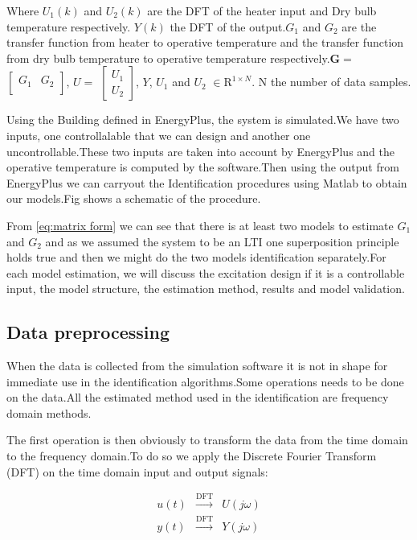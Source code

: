 \documentclass[a4paper,12pt]{article}
\numberwithin{equation}{section}
\begin{document}
\noindent
Where $ U_{1}(k)$ and $ U_{2}(k)$ are the DFT of the heater input and Dry bulb temperature respectively. $Y(k)$ the DFT of the output.$G_{1}$ and $G_{2}$ are the transfer function from heater to operative temperature and the transfer function from dry bulb temperature to operative temperature respectively.$\mathbf{G}=$
 $\begin{bmatrix}
  G_{1} & G_{2}\\ 
\end{bmatrix}$, $U=$
 $\begin{bmatrix}
  U_{1}\\ 
  U_{2}
\end{bmatrix}$, $Y$, $U_{1}$ and $U_{2}$ $\in \mathrm{R}^{1 \times N}$. N the number of data samples.

Using the Building defined in EnergyPlus, the system is simulated.We have two inputs, one controllalable that we can design and another one uncontrollable.These two inputs are taken into account by EnergyPlus and the operative temperature is computed by the software.Then using the output from EnergyPlus we can carryout the Identification procedures using Matlab to obtain our models.Fig shows a schematic of the procedure.


From \ref{eq:matrix form} we can see that there is at least two models to estimate $G_{1}$ and $G_{2}$ and as we assumed the system to be an LTI one superposition principle holds true and then we might do the two models identification separately.For each model estimation, we will discuss the excitation design if it is a controllable input, the model structure, the estimation method, results and model validation.

\subsection{Data preprocessing}
When the data is collected from the simulation software it is not in shape for immediate use in the identification algorithms.Some operations needs to be done on the data.All the estimated method used in the identification are frequency domain methods.

The first operation is then obviously to transform the data from the time domain to the frequency domain.To do so we apply the  Discrete Fourier Transform (DFT) on the time domain input and output signals:

\begin{equation}
\begin{array}{rll}
u(t) & \stackrel{\mathrm{DFT}}{\longrightarrow} & U(j \omega) \\
y(t) & \stackrel{\mathrm{DFT}}{\longrightarrow} & Y(j \omega)
\end{array}
\end{equation}
\end{document}
